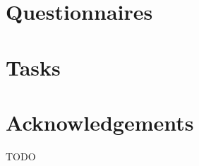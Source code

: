 \documentclass[11pt,a4paper]{globis-book}
\begin{document}
\appendix

\chapter{Questionnaires}
\label{sec:questionnaires}
\newpage

\newpage

\newpage

\newpage


\chapter{Tasks}
\label{sec:tasks}
\newpage

\newpage

\newpage

\newpage



\listoffigures
\listoftables

\chapter*{Acknowledgements}

TODO

\newpage
\thispagestyle{empty}



\end{document}
